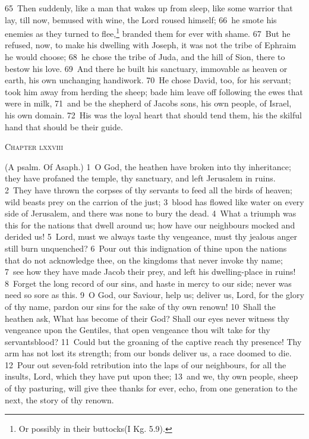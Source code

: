 \documentclass[10pt]{book} %
\begin{document}
\textcolor{benred8}{65}~Then suddenly, like a man that wakes up from sleep, like some warrior that lay, till now, bemused with wine, the Lord roused himself; \textcolor{benred8}{66}~he smote his enemies as they turned to flee,\footnote[3]{Or possibly \textasciigrave in their buttocks\textquotesingle  (I Kg. 5.9).} branded them for ever with shame. \textcolor{benred8}{67}~But he refused, now, to make his dwelling with Joseph, it was not the tribe of Ephraim he would choose; \textcolor{benred8}{68}~he chose the tribe of Juda, and the hill of Sion, there to bestow his love. \textcolor{benred8}{69}~And there he built his sanctuary, immovable as heaven or earth, his own unchanging handiwork. \textcolor{benred8}{70}~He chose David, too, for his servant; took him away from herding the sheep; bade him leave off following the ewes that were in milk, \textcolor{benred8}{71}~and be the shepherd of Jacob\textquotesingle s sons, his own people, of Israel, his own domain. \textcolor{benred8}{72}~His was the loyal heart that should tend them, his the skilful hand that should be their guide.
\begin{large}\begin{center}\textsc{Chapter lxxviii}\end{center}\end{large}
(A psalm. Of Asaph.)
\textcolor{benred8}{1}~O God, the heathen have broken into thy inheritance; they have profaned the temple, thy sanctuary, and left Jerusalem in ruins. \textcolor{benred8}{2}~They have thrown the corpses of thy servants to feed all the birds of heaven; wild beasts prey on the carrion of the just; \textcolor{benred8}{3}~blood has flowed like water on every side of Jerusalem, and there was none to bury the dead. \textcolor{benred8}{4}~What a triumph was this for the nations that dwell around us; how have our neighbours mocked and derided us! \textcolor{benred8}{5}~Lord, must we always taste thy vengeance, must thy jealous anger still burn unquenched? \textcolor{benred8}{6}~Pour out this indignation of thine upon the nations that do not acknowledge thee, on the kingdoms that never invoke thy name; \textcolor{benred8}{7}~see how they have made Jacob their prey, and left his dwelling-place in ruins! \textcolor{benred8}{8}~Forget the long record of our sins, and haste in mercy to our side; never was need so sore as this.
\textcolor{benred8}{9}~O God, our Saviour, help us; deliver us, Lord, for the glory of thy name, pardon our sins for the sake of thy own renown! \textcolor{benred8}{10}~Shall the heathen ask, What has become of their God? Shall our eyes never witness thy vengeance upon the Gentiles, that open vengeance thou wilt take for thy servants\textquotesingle  blood? \textcolor{benred8}{11}~Could but the groaning of the captive reach thy presence! Thy arm has not lost its strength; from our bonds deliver us, a race doomed to die. \textcolor{benred8}{12}~Pour out seven-fold retribution into the laps of our neighbours, for all the insults, Lord, which they have put upon thee; \textcolor{benred8}{13}~and we, thy own people, sheep of thy pasturing, will give thee thanks for ever, echo, from one generation to the next, the story of thy renown.
\end{document}
